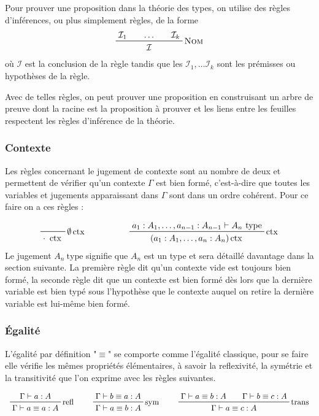 \documentclass[../../rapport.tex]{subfiles}
\begin{document}
  Pour prouver une proposition dans la théorie des types, on utilise des règles d'inférences, ou plus simplement règles, de la forme
  $$
  \prfinterspace=2em
  \prftree[r]{\textsc{Nom}}{\mathcal I_1}{\hdots}{\mathcal I_k}{\mathcal I}
  $$
  où $\mathcal I$ est la conclusion de la règle tandis que les $\mathcal I_1, \hdots \mathcal I_k$
  sont les prémisses ou hypothèses de la règle.

  Avec de telles règles, on peut prouver une proposition en construisant un arbre de preuve
  dont la racine est la proposition à prouver et les liens entre les feuilles respectent les règles d'inférence de la théorie.

  \subsubsection{Contexte}

  Les règles concernant le jugement de contexte sont au nombre de deux et permettent de vérifier qu'un contexte $\Gamma$ est bien formé,
  c'est-à-dire que toutes les variables et jugements apparaissant dans $\Gamma$ sont dans un ordre cohérent.
  Pour ce faire on a ces règles :

  $$
  \begin{array}{cc}
    \prfbyaxiom{$\emptyset\ctx$}{\cdot\ \ctx} \hspace{1.5cm}
    & \prftree[r]{$\ctx$}{a_1 : A_1, \hdots, a_{n-1} : A_{n-1} \vdash A_n\ \text{type}}
      {(a_1 : A_1, \hdots, a_n : A_n) \ctx}
  \end{array}
  $$
  Le jugement $A_n\ \text{type}$ signifie que $A_n$ est un type et sera détaillé davantage dans la section suivante.
  La première règle dit qu'un contexte vide est toujours bien formé, la seconde règle dit que un contexte est bien formé
  dès lors que la dernière variable est bien typé sous l'hypothèse que le contexte auquel on retire la dernière variable
  est lui-même bien formé.

  \subsubsection{Égalité}

  L'égalité par définition "$\equiv$" se comporte comme l'égalité classique, pour se faire elle vérifie les mêmes propriétés élémentaires,
  à savoir la reflexivité, la symétrie et la transitivité que l'on exprime avec les règles suivantes.

  $$
  \prfinterspace=2em
  \begin{array}{ccc}
    \prftree[r]{refl}{\Gamma \vdash a : A}{\Gamma \vdash a \equiv a : A} \hspace{0.5cm}
    & \prftree[r]{sym} {\Gamma \vdash b \equiv a : A}{\Gamma \vdash a \equiv b : A} \hspace{0.5cm}
    & \prftree[r]{trans}{\Gamma \vdash a \equiv b : A}{\Gamma \vdash b \equiv c : A}{\Gamma \vdash a \equiv c : A}
  \end{array}
  $$
\end{document}

